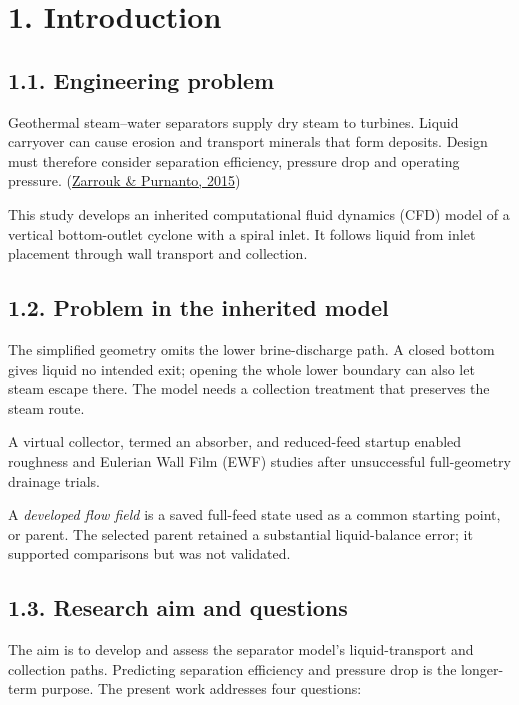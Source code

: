 \documentclass[
  12pt,
  a4paper,
]{article}
\author{}
\date{}
\begin{document}
\section{1. Introduction}\label{introduction}

\subsection{1.1. Engineering problem}\label{engineering-problem}

Geothermal steam--water separators supply dry steam to turbines. Liquid
carryover can cause erosion and transport minerals that form deposits.
Design must therefore consider separation efficiency, pressure drop and
operating pressure.
(\href{https://doi.org/10.1016/j.geothermics.2014.05.009}{Zarrouk \&
Purnanto, 2015})

This study develops an inherited computational fluid dynamics (CFD)
model of a vertical bottom-outlet cyclone with a spiral inlet. It
follows liquid from inlet placement through wall transport and
collection.

\subsection{1.2. Problem in the inherited
model}\label{problem-in-the-inherited-model}

The simplified geometry omits the lower brine-discharge path. A closed
bottom gives liquid no intended exit; opening the whole lower boundary
can also let steam escape there. The model needs a collection treatment
that preserves the steam route.

A virtual collector, termed an absorber, and reduced-feed startup
enabled roughness and Eulerian Wall Film (EWF) studies after
unsuccessful full-geometry drainage trials.

A \emph{developed flow field} is a saved full-feed state used as a
common starting point, or parent. The selected parent retained a
substantial liquid-balance error; it supported comparisons but was not
validated.

\subsection{1.3. Research aim and
questions}\label{research-aim-and-questions}

The aim is to develop and assess the separator model's liquid-transport
and collection paths. Predicting separation efficiency and pressure drop
is the longer-term purpose. The present work addresses four questions:
\end{document}
